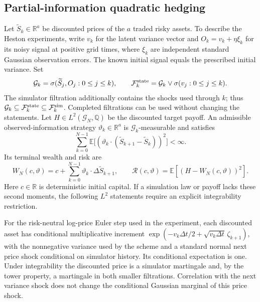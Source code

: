 \documentclass[11pt,a4paper]{article}
\numberwithin{equation}{section}
\theoremstyle{definition}
\theoremstyle{remark}
\newcommand{\R}{\mathbb R}
\newcommand{\E}{\mathbb E}
\begin{document}
\subsection{Partial-information quadratic hedging}
Let $\widetilde S_k\in\R^a$ be discounted prices of the $a$ traded risky
assets. To describe the Heston experiments, write $v_k$ for the latent
variance vector and $O_k=v_k+\eta\xi_k$ for its noisy signal at positive
grid times, where $\xi_k$ are independent standard Gaussian observation
errors. The known initial signal equals the prescribed initial variance.
Set
\[
 \mathcal G_k=\sigma(\widetilde S_j,O_j:0\leq j\leq k),\qquad
 \mathcal F_k^{\rm state}=\mathcal G_k\vee\sigma(v_j:0\leq j\leq k).
\]
The simulator filtration additionally contains the shocks used through $k$;
thus $\mathcal G_k\subseteq\mathcal F_k^{\rm state}
\subseteq\mathcal F_k^{\rm sim}$. Completed filtrations can be used without
changing the statements. Let $H\in L^2(\mathcal G_N,\mathbb Q)$ be the
discounted target payoff. An admissible observed-information strategy
$\vartheta_k\in\R^a$ is $\mathcal G_k$-measurable and satisfies
\[
 \sum_{k=0}^{N-1}\E\bigl[(\vartheta_k\cdot
 (\widetilde S_{k+1}-\widetilde S_k))^2\bigr]<\infty.
\]
Its terminal wealth and risk are
\begin{equation}\label{eq:hedging}
 W_N(c,\vartheta)=c+\sum_{k=0}^{N-1}\vartheta_k\cdot
 \Delta\widetilde S_{k+1},\qquad
 \mathcal R(c,\vartheta)=\E[(H-W_N(c,\vartheta))^2].
\end{equation}
Here $c\in\R$ is deterministic initial capital. If a simulation law or
payoff lacks these second moments, the following $L^2$ statements require
an explicit integrability restriction.

For the risk-neutral log-price Euler step used in the experiment, each
discounted asset has conditional multiplicative increment
$\exp(-v_k\Delta t/2+\sqrt{v_k\Delta t}\,\zeta_{k+1})$, with the
nonnegative variance used by the scheme and a standard normal next price
shock conditional on simulator history. Its conditional expectation is one.
Under integrability the discounted price is a simulator martingale and,
by the tower property, a martingale in both smaller filtrations. Correlation
with the next variance shock does not change the conditional Gaussian
marginal of this price shock.
\end{document}
